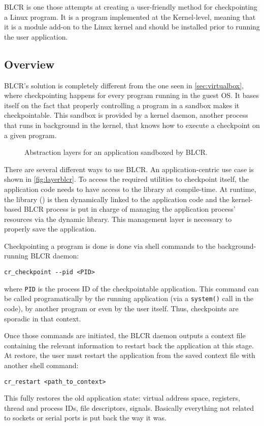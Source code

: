 \gls{BLCR} is one those attempts at creating a user-friendly method for checkpointing a Linux program. It is a program implemented at the Kernel-level, meaning that it is a module add-on to the Linux kernel and should be installed prior to running the user application.

\subsection*{Overview}
\gls{BLCR}'s solution is completely different from the one seen in \autoref{sec:virtualbox}, where checkpointing happens for every program running in the guest OS. It bases itself on the fact that properly controlling a program in a sandbox makes it checkpointable. This sandbox is provided by a kernel daemon, another process that runs in background in the kernel, that knows how to execute a checkpoint on a given program. 
\begin{figure}[htbp]
	\centering \small
	
	\caption{Abstraction layers for an application sandboxed by BLCR.}
	\label{fig:layerblcr}
\end{figure}

There are several different ways to use \gls{BLCR}. An application-centric use case is shown in \autoref{fig:layerblcr}. To access the required utilities to checkpoint itself, the application code needs to have access to the library at compile-time. At runtime, the library () is then dynamically linked to the application code and the kernel-based BLCR process is put in charge of managing the application process' resources via the dynamic library. This management layer is necessary to properly save the application.

Checkpointing a program is done is done via shell commands to the background-running BLCR daemon:
\begin{tcolorbox}
\begin{verbatim}
cr_checkpoint --pid <PID>
\end{verbatim}
\end{tcolorbox}

where \texttt{PID} is the process ID of the checkpointable application. This command can be called programatically by the running application (via a \texttt{system()} call in the code), by another program or even by the user itself. Thus, checkpoints are sporadic in that context.

Once those commands are initiated, the \gls{BLCR} daemon outputs a context file containing the relevant information to restart back the application at this stage. At restore, the user must restart the application from the saved context file with another shell command:
\begin{tcolorbox}
\begin{verbatim}
cr_restart <path_to_context>
\end{verbatim}
\end{tcolorbox}
This fully restores the old application state: virtual address space, registers, thread and process IDs, file descriptors, signals. Basically everything not related to sockets or serial ports is put back the way it was.

